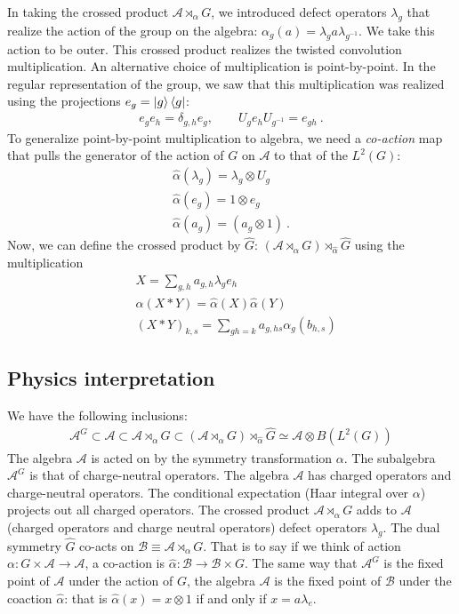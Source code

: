 \documentclass[11pt]{article}
\newcommand{\mA}{\mathcal{A}}
\newcommand{\nn}{\nonumber}
\begin{document}
In taking the crossed product $\mA\rtimes_\alpha G$, we introduced defect operators $\lambda_g$ that realize the action of the group on the algebra: $\alpha_g(a)=\lambda_g a \lambda_{g^{-1}}$. We take this action to be outer. This crossed product realizes the twisted convolution multiplication. An alternative choice of multiplication is point-by-point. In the regular representation of the group, we saw that this multiplication was realized using the projections $e_g=\ket{g}\bra{g}$: 
\begin{align}
    e_g e_h=\delta_{g,h}e_g, \qquad U_g e_h U_{g^{-1}}=e_{gh}\ .
\end{align}
To generalize point-by-point multiplication to algebra, we need a {\it co-action} map that pulls the generator of the action of $G$ on $\mA$ to that of the $L^2(G)$:
\begin{align}
    \hat{\alpha}(\lambda_g)=\lambda_g\otimes U_g\nn\\
    \hat{\alpha}(e_g)=1\otimes e_g\\
    \hat{\alpha}(a_g)=(a_g\otimes 1)\ .
\end{align}
Now, we can define the crossed product by $\hat{G}$: $(\mA\rtimes_\alpha G)\rtimes_{\hat{\alpha}}\hat{G}$ using the multiplication
\begin{align}
&X=\sum_{g,h}a_{g,h}\lambda_g e_h\nn\\
&\hat{\alpha}(X*Y)=\hat{\alpha}(X)\hat{\alpha}(Y)\nn\\
&(X*Y)_{k,s}=\sum_{gh=k}a_{g,hs}\alpha_g(b_{h,s})
\end{align}

\subsection{Physics interpretation}

We have the following inclusions:
\begin{align}
    \mA^G\subset \mA\subset \mA\rtimes_\alpha G\subset (\mA\rtimes_\alpha G)\rtimes_{\hat{\alpha}}\hat{G}\simeq \mA\otimes B(L^2(G))
\end{align}
The algebra $\mA$ is acted on by the symmetry transformation $\alpha$. The subalgebra $\mA^G$ is that of charge-neutral operators. The algebra $\mA$ has charged operators and charge-neutral operators. The conditional expectation (Haar integral over $\alpha$) projects out all charged operators. The crossed product $\mA\rtimes_\alpha G$ adds to $\mA$ (charged operators and charge neutral operators) defect operators $\lambda_g$. The dual symmetry $\hat{G}$ co-acts on $\mathcal{B}\equiv \mA\rtimes_\alpha G$. That is to say if we think of action $\alpha:G\times \mA\to \mA$, a co-action is $\hat{\alpha}:\mathcal{B}\to \mathcal{B}\times G$. The same way that $\mA^G$ is the fixed point of $\mA$ under the action of $G$, the algebra $\mA$ is the fixed point of $\mathcal{B}$ under the coaction $\hat{\alpha}$: that is $\hat{\alpha}(x)=x\otimes 1$ if and only if $x=a \lambda_{e}$. 
\end{document}
